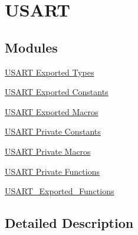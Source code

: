 \hypertarget{group___u_s_a_r_t}{}\section{U\+S\+A\+RT}
\label{group___u_s_a_r_t}
\subsection*{Modules}
\begin{DoxyCompactItemize}
\item 
\hyperlink{group___u_s_a_r_t___exported___types}{U\+S\+A\+R\+T Exported Types}
\item 
\hyperlink{group___u_s_a_r_t___exported___constants}{U\+S\+A\+R\+T Exported Constants}
\item 
\hyperlink{group___u_s_a_r_t___exported___macros}{U\+S\+A\+R\+T Exported Macros}
\item 
\hyperlink{group___u_s_a_r_t___private___constants}{U\+S\+A\+R\+T Private Constants}
\item 
\hyperlink{group___u_s_a_r_t___private___macros}{U\+S\+A\+R\+T Private Macros}
\item 
\hyperlink{group___u_s_a_r_t___private___functions}{U\+S\+A\+R\+T Private Functions}
\item 
\hyperlink{group___u_s_a_r_t___exported___functions}{U\+S\+A\+R\+T\+\_\+\+Exported\+\_\+\+Functions}
\end{DoxyCompactItemize}


\subsection{Detailed Description}
